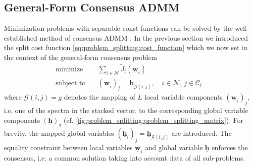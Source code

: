 \documentclass{article}
\newcommand{\hf}{\underline{\bm{h}}}
\newcommand{\wf}{\underline{\bm{w}}}
\newcommand{\Cset}{\mathcal{C}}
\newcommand{\Nset}{\mathcal{N}}
\begin{document}
\subsection{General-Form Consensus ADMM}
\label{ssec:general_consensus_admm}
Minimization problems with separable const functions can be solved by the well established method of consensus ADMM \cite{boydDistributedOptimizationStatistical2011}.
In the previous section we introduced the split cost function \eqref{eq:problem_splitting:cost_function} which we now set in the context of the general-form consensus problem
\begin{align}
    \operatorname{minimize} \quad &\sum_{i \in \Nset} \tilde{J}_i(\wf_i)\\
    \text{subject to} \quad &(\wf_i)_j = \hf_{\mathcal{G}(i,j)},\quad i \in \Nset,\,j \in \Cset_i
\end{align}
where \(\mathcal{G}(i,j)=g\) denotes the mapping of \(L\) local variable components \((\wf_i)_j\), i.e. one of the spectra in the stacked vector, to the corresponding global variable components \((\hf)_g\) (cf. \autoref{fig:problem_splitting:problem_splitting_matrix}).
For brevity, the mapped global variables \((\tilde{\hf}_i)_j = \hf_{\mathcal{G}(i,j)}\) are introduced.
The equality constraint between local variables \(\wf_i\) and global variable \(\hf\) enforces the consensus, i.e. a common solution taking into account data of all sub-problems.
\end{document}
